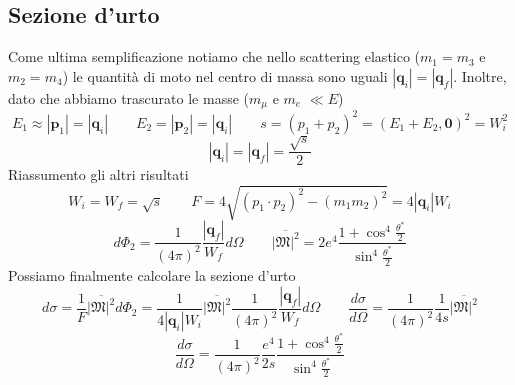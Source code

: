 \subsection{Sezione d'urto}
Come ultima semplificazione notiamo che nello scattering elastico ($m_1=m_3$ e $m_2=m_4$) le quantità di moto nel centro di massa sono uguali $|\mathbf{q}_i|=|\mathbf{q}_f|$. Inoltre, dato che abbiamo trascurato le masse ($m_\mu$ e $m_e$ $\ll E $)
$$
E_1 \approx |\mathbf{p}_1| = |\mathbf{q}_i| \qquad E_2 = |\mathbf{p}_2| = |\mathbf{q}_i| \qquad s = (p_1 + p_2)^2 = (E_1 + E_2, \mathbf{0})^2 = W_i^2
$$
$$
|\mathbf{q}_i| = |\mathbf{q}_f| = \frac{\sqrt{s}}{2}
$$
Riassumento gli altri risultati
$$
W_i = W_f = \sqrt{s} \qquad F = 4\sqrt{(p_1 \cdot p_2)^2 - (m_1 m_2)^2} = 4|\mathbf{q}_i| W_i
$$
$$
d\Phi_2 = \frac{1}{(4\pi)^2} \frac{|\mathbf{q}_f|}{W_f} d\Omega \qquad \overline{|\mathfrak{M}|^2} = 2e^4 \frac{1 + \cos^4 \frac{\theta^*}{2}}{\sin^4 \frac{\theta^*}{2}}
$$
Possiamo finalmente calcolare la sezione d'urto
$$
d\sigma = \frac{1}{F} \overline{|\mathfrak{M}|^2} d\Phi_2 = \frac{1}{4|\mathbf{q}_i| W_i} \overline{|\mathfrak{M}|^2} \frac{1}{(4\pi)^2} \frac{|\mathbf{q}_f|}{W_f} d\Omega\qquad \frac{d\sigma}{d\Omega} = \frac{1}{(4\pi)^2} \frac{1}{4s} \overline{|\mathfrak{M}|^2}
$$
$$
\frac{d\sigma}{d\Omega} = \frac{1}{(4\pi)^2} \frac{e^4}{2s} \frac{1 + \cos^4 \frac{\theta^*}{2}}{\sin^4 \frac{\theta^*}{2}}
$$